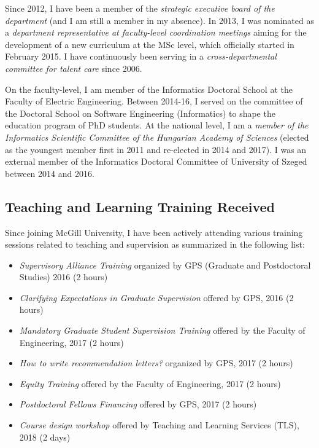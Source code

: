 Since 2012, I have been a member of the \emph{strategic executive board of the department} (and I am still a member in my absence). In 2013, I was nominated as a \emph{department representative at faculty-level coordination meetings} aiming for the development of a new curriculum at the MSc level, which officially started in February 2015. I have continuously been serving in a \emph{cross-departmental committee for talent care} since 2006. 

On the faculty-level, I am member of the Informatics Doctoral School at the Faculty of Electric Engineering. Between 2014-16, I served on the committee of the Doctoral School on Software Engineering (Informatics) to shape the education program of PhD students. At the national level, I am a \emph{member of the Informatics Scientific Committee of the Hungarian Academy of Sciences} (elected as the youngest member first in 2011 and re-elected in 2014 and 2017). I was an external member of the Informatics Doctoral Committee of University of Szeged between 2014 and 2016.

\subsection{Teaching and Learning Training Received}
Since joining McGill University, I have been actively attending various training sessions related to teaching and supervision as summarized in the following list:

\begin{itemize}
\item \emph{Supervisory Alliance Training} organized by GPS (Graduate and Postdoctoral Studies)  2016 (2 hours)
\item \emph{Clarifying Expectations in Graduate Supervision} offered by GPS,  2016 (2 hours)
\item \emph{Mandatory Graduate Student Supervision Training} offered by the Faculty of Engineering,  2017 (2 hours)
\item \emph{How to write recommendation letters?} organized by GPS, 2017 (2 hours)
\item \emph{Equity Training} offered by the Faculty of Engineering, 2017 (2 hours)
\item \emph{Postdoctoral Fellows Financing} offered by GPS, 2017 (2 hours)
\item \emph{Course design workshop} offered by Teaching and Learning Services (TLS), 2018 (2 days)
\end{itemize}

